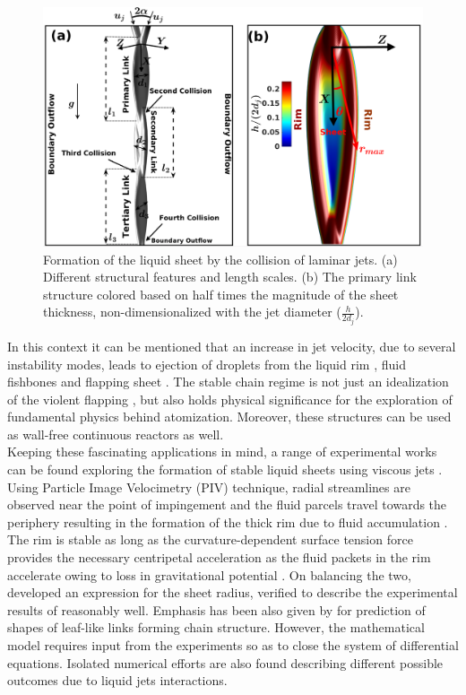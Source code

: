 \documentclass[%
 aip,
 sd,%
amsmath,amssymb,
preprint,%
author-year,%
]{revtex4-1}
\begin{document}
\begin{figure}
	\centering
	\includegraphics[width=\textwidth]{Figure1}
	\caption{Formation of the liquid sheet by the collision of laminar jets. (a) Different structural features and length scales. (b) The primary link structure colored based on half times the magnitude of the sheet thickness, non-dimensionalized with the jet diameter ($\frac{h}{2d_j}$).}
	\label{Figure::schematic}
\end{figure}
In this context it can be mentioned that an increase in jet velocity, due to several instability modes, leads to ejection of droplets from the liquid rim \citep{bremond2006atomization}, fluid fishbones \citep{bush2004collision} and flapping sheet \citep{villermaux2002life}. The stable chain regime is not just an idealization of the violent flapping \citep{ibrahim1991impinging}, but also holds physical significance for the exploration of fundamental physics behind atomization. Moreover, these structures can be used as wall-free continuous reactors \citep{erni2013free} as well.\\
Keeping these fascinating applications in mind, a range of experimental works can be found exploring the formation of stable liquid sheets using viscous jets \citep{choo2001parametric,choo2002velocity,bush2004collision}. Using Particle Image Velocimetry (PIV) technique, radial streamlines are observed near the point of impingement and the fluid parcels travel towards the periphery resulting in the formation of the thick rim due to fluid accumulation \citep{choo2002velocity,bush2004collision}. The rim is stable as long as the curvature-dependent surface tension force provides the necessary centripetal acceleration as the fluid packets in the rim accelerate owing to loss in gravitational potential \citep{bremond2006atomization}. On balancing the two, \cite{taylor1960formation} developed an expression for the sheet radius, verified to describe the experimental results of \cite{bush2004collision} reasonably well. Emphasis has been also given by \cite{bush2004collision} for prediction of shapes of leaf-like links forming chain structure. However, the mathematical model requires input from the experiments so as to close the system of differential equations. Isolated numerical efforts are also found describing different possible outcomes due to liquid jets interactions.\\
\end{document}
